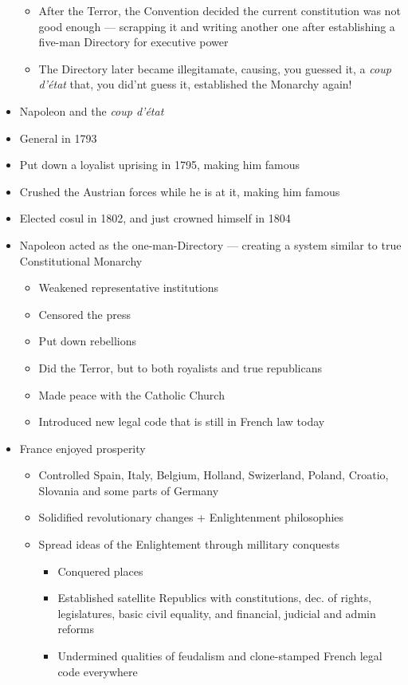 \documentclass[letterpaper]{article}
\begin{document}
\begin{itemize}
\begin{itemize}
\item After the Terror, the Convention decided the current constitution
was not good enough --- scrapping it and writing another one after
establishing a five-man Directory for executive power
\item The Directory later became illegitamate, causing, you guessed it, a
\emph{coup d'état} that, you did'nt guess it, established the Monarchy
again!
\end{itemize}

\item Napoleon and the \emph{coup d'état}
\item General in 1793
\item Put down a loyalist uprising in 1795, making him famous
\item Crushed the Austrian forces while he is at it, making him famous
\item Elected cosul in 1802, and just crowned himself in 1804
\item Napoleon acted as the one-man-Directory --- creating a system similar
to true Constitutional Monarchy

\begin{itemize}
\item Weakened representative institutions
\item Censored the press
\item Put down rebellions
\item Did the Terror, but to both royalists and true republicans
\item Made peace with the Catholic Church
\item Introduced new legal code that is still in French law today\\
\end{itemize}

\item France enjoyed prosperity

\begin{itemize}
\item Controlled Spain, Italy, Belgium, Holland, Swizerland, Poland,
Croatio, Slovania and some parts of Germany
\item Solidified revolutionary changes + Enlightenment philosophies
\item Spread ideas of the Enlightement through millitary conquests

\begin{itemize}
\item Conquered places
\item Established satellite Republics with constitutions, dec. of
rights, legislatures, basic civil equality, and financial,
judicial and admin reforms
\item Undermined qualities of feudalism and clone-stamped French legal
code everywhere
\end{itemize}


\end{itemize}
\end{itemize}
\end{document}
